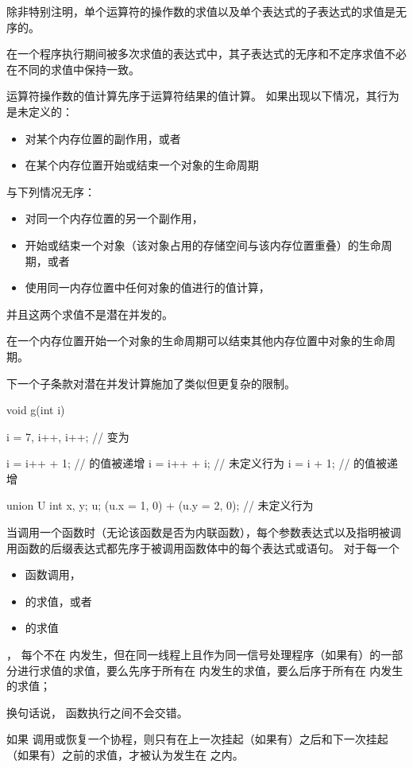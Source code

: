 \pnum
{}%
除非特别注明，单个运算符的操作数的求值以及单个表达式的子表达式的求值是无序的。
\begin{note}
在一个程序执行期间被多次求值的表达式中，其子表达式的无序和不定序求值不必在不同的求值中保持一致。
\end{note}
运算符操作数的值计算先序于运算符结果的值计算。
如果出现以下情况，其行为是未定义的：
\begin{itemize}
\item
对某个内存位置的副作用，或者
\item
在某个内存位置开始或结束一个对象的生命周期
\end{itemize}
与下列情况无序：
\begin{itemize}
\item
对同一个内存位置的另一个副作用，
\item
开始或结束一个对象（该对象占用的存储空间与该内存位置重叠）的生命周期，或者
\item
使用同一内存位置中任何对象的值进行的值计算，
\end{itemize}
并且这两个求值不是潜在并发的。
\begin{note}
在一个内存位置开始一个对象的生命周期可以结束其他内存位置中对象的生命周期。
\end{note}
\begin{note}
下一个子条款对潜在并发计算施加了类似但更复杂的限制。
\end{note}

\begin{example}
\begin{codeblock}
void g(int i) {
  i = 7, i++, i++;              //  变为 

  i = i++ + 1;                  //  的值被递增
  i = i++ + i;                  // 未定义行为
  i = i + 1;                    //  的值被递增

  union U { int x, y; } u;
  (u.x = 1, 0) + (u.y = 2, 0);  // 未定义行为
}
\end{codeblock}
\end{example}

\pnum
当调用一个函数时（无论该函数是否为内联函数），每个参数表达式以及指明被调用函数的后缀表达式都先序于被调用函数体中的每个表达式或语句。
对于每一个
\begin{itemize}
\item 函数调用，
\item {} 的求值，或者
\item {} 的求值
\end{itemize}
，
每个不在  内发生，但在同一线程上且作为同一信号处理程序（如果有）的一部分进行求值的求值，要么先序于所有在  内发生的求值，要么后序于所有在  内发生的求值；
\begin{footnote}
换句话说，
函数执行之间不会交错。
\end{footnote}
如果  调用或恢复一个协程，则只有在上一次挂起（如果有）之后和下一次挂起（如果有）之前的求值，才被认为发生在  之内。

